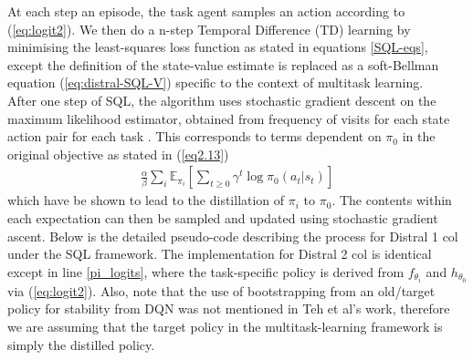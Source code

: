 \documentclass[12pt]{report}
\begin{document}
At each step an episode, the task agent samples an action according to (\ref{eq:logit2}). We then do a n-step Temporal Difference (TD) learning by minimising the least-squares loss function as stated in equations \ref{SQL-eqs}, except the definition of the state-value estimate is replaced as a soft-Bellman equation (\ref{eq:distral-SQL-V}) specific to the context of multitask learning.\\



After one step of SQL, the algorithm uses stochastic gradient descent on the maximum likelihood estimator, obtained from frequency of visits for each state action pair for each task \cite{teh2017distral}. This corresponds to terms dependent on $\pi_0$ in the original objective as stated in (\ref{eq2.13})
\begin{align}
    \frac{\alpha}{\beta} \sum_i \mathbb{E}_{\pi_i} \left[\sum_{t\ge 0} \gamma^t \log \pi_0(a_t|s_t)\right] \label{eq2.24}
\end{align}
which have be shown \cite{hinton2015distilling} \cite{rusu2015policy} \cite{parisotto2015actor} to lead to the distillation of $\pi_i$ to $\pi_0$. The contents within each expectation can then be sampled and updated using stochastic gradient ascent. Below is the detailed pseudo-code describing the process for Distral 1 col under the SQL framework. The implementation for Distral 2 col is identical except in line \ref{pi_logits}, where the task-specific policy is derived from $f_{\theta_i}$ and $h_{\theta_0}$ via (\ref{eq:logit2}). Also, note that the use of bootstrapping from an old/target policy for stability from DQN \cite{mnih2013playing} was not mentioned in Teh et al's work, therefore we are assuming that the target policy in the multitask-learning framework is simply the distilled policy.
\end{document}
